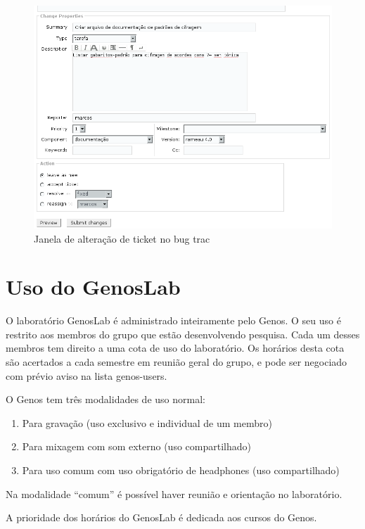 \documentclass[12pt,brazil]{book}
\begin{document}
\begin{figure}
  \centering
  \includegraphics[scale=.7]{trac-closeticket}
  \caption{Janela de alteração de ticket no bug trac}
  \label{fig:trac-closeticket}
\end{figure}

\chapter{Uso do GenosLab}
\label{cha:uso-do-genoslab}

O laboratório GenosLab é administrado inteiramente pelo Genos. O seu
uso é restrito aos membros do grupo que estão desenvolvendo
pesquisa. Cada um desses membros tem direito a uma cota de uso do
laboratório. Os horários desta cota são acertados a cada semestre em
reunião geral do grupo, e pode ser negociado com prévio aviso na lista
genos-users.

O Genos tem três modalidades de uso normal:
\begin{enumerate}
\item Para gravação (uso exclusivo e individual de um membro)
\item Para mixagem com som externo (uso compartilhado)
\item Para uso comum com uso obrigatório de headphones (uso
  compartilhado)
\end{enumerate}

Na modalidade ``comum'' é possível haver reunião e orientação no
laboratório.

A prioridade dos horários do GenosLab é dedicada aos cursos do Genos.
\end{document}
